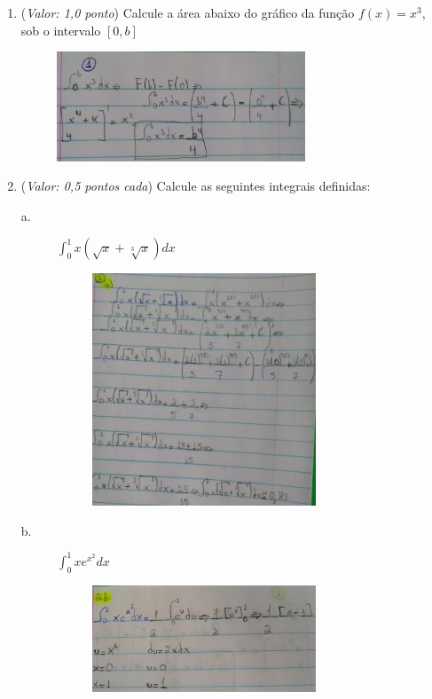\documentclass[a4paper, 12pt]{article}
\begin{document}
\begin{enumerate}
\item ({\it Valor: 1,0 ponto}) Calcule a área abaixo do gráfico da função $ f(x)= x^{3} $, sob o intervalo $ [0,b] $

  \begin{figure}[h!]
  \centering
  \includegraphics[width=0.7\textwidth]{resp1}
  \end{figure} \newpage

  \item ({\it Valor: 0,5 pontos cada}) Calcule as seguintes integrais definidas:
  \begin{description}
  \item[a.] $ \int_0^{1}x(\sqrt{x}+\sqrt[3]{x})dx $

  \begin{figure}[h!]
  \centering
  \includegraphics[width=0.7\textwidth]{resp2a}
  \end{figure} \newpage 
    
  \item[b.] $ \int_0^{1}xe^{x^{2}}dx $
  \begin{figure}[h!]
  \centering
  \includegraphics[width=0.7\textwidth]{resp2b}
  \end{figure}  \newpage
  

\end{description}
\end{enumerate}
\end{document}
